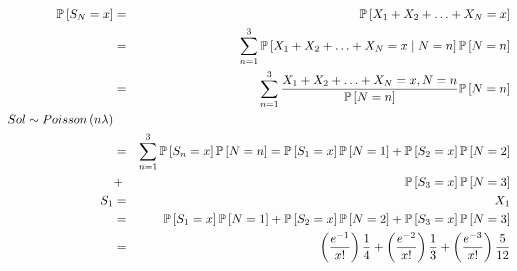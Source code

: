 \begin{enumerate}
 \begin{eqnarray*}
 \mathbb{P} \left[ S_{N} = x \right] &=& \mathbb{P} \left[ X_{1}+ X_{2}+ \ldots + X_{N} = x\right]\\
 &=& \sum_{n=1}^{3} \mathbb{P} \left[ X_{1}+ X_{2}+ \ldots + X_{N} = x \mid N=n \right] \mathbb{P} \left[ N=n \right]\\
 &=&\sum_{n=1}^{3} \dfrac{X_{1}+ X_{2}+ \ldots + X_{N} = x , N=n}{\mathbb{P} \left[N=n \right] } \mathbb{P} \left[N=n \right]\\
 Sol \sim Poisson \left(n \lambda \right)\\
 &=& \sum_{n=1}^{3} \mathbb{P} \left[S_{n}= x \right] \mathbb{P} \left[ N=n\right]= \mathbb{P} \left[ S_{1}=x \right] \mathbb{P} \left[N=1 \right]+ \mathbb{P} \left[S_{2}= x \right] \mathbb{P} \left[ N=2 \right]\\ &+& \mathbb{P} \left[S_{3}= x \right]\mathbb{P} \left[N=3 \right]\\
 S_{1} &=& X_{1}\\
 &=&\mathbb{P} \left[S_{1} = x \right] \mathbb{P} \left[ N=1\right]+ \mathbb{P} \left[ S_{2}= x \right] \mathbb{P} \left[N=2 \right] + \mathbb{P}  \left[S_{3}= x \right]\mathbb{P} \left[ N=3 \right]\\
 &=& \left( \frac{e^{-1}}{x!}\right)\frac{1}{4}+ \left( \frac{e^{-2}}{x!} \right) \frac{1}{3} + \left( \frac{e^{-3}}{x!} \right) \frac{5}{12}
 \end{eqnarray*}
\end{enumerate}
